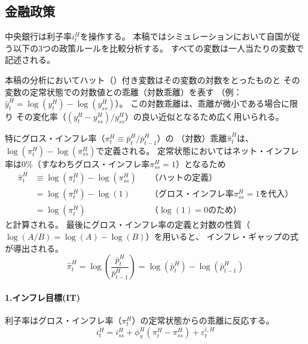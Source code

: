 \subsection{金融政策}
\label{sec:model_policies_monetary_policy}
中央銀行は利子率\(i_t^H\)を操作する。
本稿ではシミュレーションにおいて自国が従う以下の3つの政策ルールを比較分析する。
すべての変数は一人当たりの変数で記述される。

本稿の分析においてハット（\(\hat{}\)）付き変数はその変数の対数をとったものと
その変数の定常状態での対数値との乖離（対数乖離）を表す
（例：\(\hat{y}_t^H=\log(y_t^H)-\log(y_{ss}^H)\)）。
この対数乖離は、乖離が微小である場合に限り
その変化率（\((y_t^H-y_{ss}^H)/y_{ss}^H\)）の良い近似となるため広く用いられる。

特にグロス・インフレ率（\(\pi_t^H\equiv\bar{p}_t^H/\bar{p}_{t-1}^H\)）の
（対数）乖離\(\hat{\pi}_t^H\)は、\(\log(\pi_t^H)-\log(\pi_{ss}^H)\)で定義される。
定常状態においてはネット・インフレ率は0\%（すなわちグロス・インフレ率\(\pi_{ss}^H=1\)）となるため
\begin{align}
\label{form:model_policies_pi_hat_derivation}
    \hat{\pi}_t^H&\equiv\log(\pi_t^H)-\log(\pi_{ss}^H)&&\text{（ハットの定義）} \nonumber \\
    &=\log(\pi_t^H)-\log(1)&&\text{（グロス・インフレ率\(\pi_{ss}^H=1\)を代入）} \nonumber \\
    &=\log(\pi_t^H)&&\text{（\(\log(1)=0\)のため）}
\end{align}
と計算される。
最後にグロス・インフレ率の定義と対数の性質（\(\log(A/B)=\log(A)-\log(B)\)）を用いると、
インフレ・ギャップの式が導出される。
\begin{equation}
\label{form:model_policies_pi_hat_dynamics_definition}
    \hat{\pi}_t^H=\log\left(\frac{\bar{p}_t^H}{\bar{p}_{t-1}^H}\right)=\log(\bar{p}_t^H)-\log(\bar{p}_{t-1}^H)
\end{equation}

\paragraph{1.インフレ目標(IT)}\label{sec:model_policies_monetary_policy_it}
利子率はグロス・インフレ率（\(\pi_t^H\)）の定常状態からの乖離に反応する。
\begin{equation}
\label{form:model_policies_monetary_policy_it_home}
    i_t^H=i_{ss}^H+\phi_{\pi}^H(\pi_t^H-\pi_{ss}^H)+\varepsilon_t^{i,H}
\end{equation}

